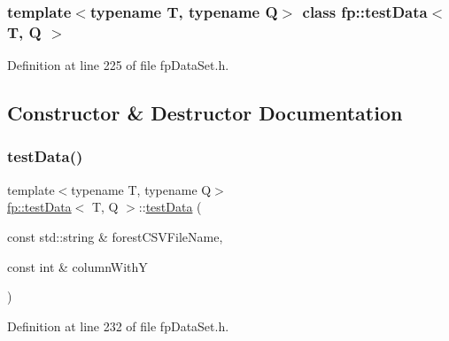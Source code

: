 \subsubsection*{template$<$typename T, typename Q$>$\newline
class fp\+::test\+Data$<$ T, Q $>$}



Definition at line 225 of file fp\+Data\+Set.\+h.



\subsection{Constructor \& Destructor Documentation}
\mbox{\label{classfp_1_1testData_a944073c36d749b13e72c8291b672dd90}} 
\subsubsection{\texorpdfstring{test\+Data()}{testData()}}
{\footnotesize\ttfamily template$<$typename T, typename Q$>$ \\
\hyperlink{classfp_1_1testData}{fp\+::test\+Data}$<$ T, Q $>$\+::\hyperlink{classfp_1_1testData}{test\+Data} (\begin{DoxyParamCaption}\item[{const std\+::string \&}]{forest\+C\+S\+V\+File\+Name,  }\item[{const int \&}]{column\+WithY }\end{DoxyParamCaption})\hspace{0.3cm}{\ttfamily [inline]}}



Definition at line 232 of file fp\+Data\+Set.\+h.



